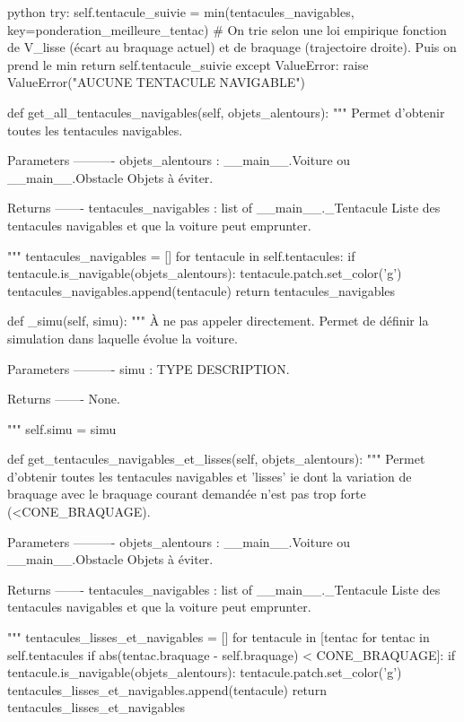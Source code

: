 \begin{mintedbox}{python}
        try:
            self.tentacule_suivie = min(tentacules_navigables, key=ponderation_meilleure_tentac)  # On trie selon une loi empirique fonction de V_lisse (écart au braquage actuel) et de braquage (trajectoire droite). Puis on prend le min
            return self.tentacule_suivie
        except ValueError:
            raise ValueError("AUCUNE TENTACULE NAVIGABLE")

    def get_all_tentacules_navigables(self, objets_alentours):
        """
        Permet d'obtenir toutes les tentacules navigables.

        Parameters
        ----------
        objets_alentours : __main__.Voiture ou __main__.Obstacle
            Objets à éviter.

        Returns
        -------
        tentacules_navigables : list of __main__._Tentacule
            Liste des tentacules navigables et que la voiture peut emprunter.

        """
        tentacules_navigables = []
        for tentacule in self.tentacules:
            if tentacule.is_navigable(objets_alentours):
                tentacule.patch.set_color('g')
                tentacules_navigables.append(tentacule)
        return tentacules_navigables

    def _simu(self, simu):
        """
        À ne pas appeler directement. Permet de définir la simulation dans laquelle évolue la voiture.

        Parameters
        ----------
        simu : TYPE
            DESCRIPTION.

        Returns
        -------
        None.

        """
        self.simu = simu

    def get_tentacules_navigables_et_lisses(self, objets_alentours):
        """
        Permet d'obtenir toutes les tentacules navigables et 'lisses' ie dont la variation de braquage avec le braquage courant demandée n'est pas trop forte (<CONE_BRAQUAGE).

        Parameters
        ----------
        objets_alentours : __main__.Voiture ou __main__.Obstacle
            Objets à éviter.

        Returns
        -------
        tentacules_navigables : list of __main__._Tentacule
            Liste des tentacules navigables et que la voiture peut emprunter.

        """
        tentacules_lisses_et_navigables = []
        for tentacule in [tentac for tentac in self.tentacules if abs(tentac.braquage - self.braquage) < CONE_BRAQUAGE]:
            if tentacule.is_navigable(objets_alentours):
                tentacule.patch.set_color('g')
                tentacules_lisses_et_navigables.append(tentacule)
        return tentacules_lisses_et_navigables



\end{mintedbox}

